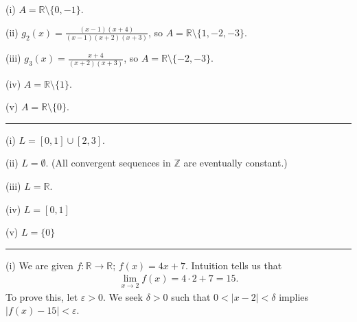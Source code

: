 \documentclass[letterpaper,10pt,english]{jupyterBook}
\begin{document}
\sphinxAtStartPar
(i) \(A=\mathbb{R} \setminus \{0, -1\}\).

\sphinxAtStartPar
(ii) \(g_{2}(x) = \displaystyle\frac{(x-1)(x+4)}{(x-1)(x+2)(x+3)}\), so \(A=\mathbb{R} \setminus \{1, -2, -3\}\).

\sphinxAtStartPar
(iii) \(g_{3}(x) = \displaystyle\frac{x+4}{(x+2)(x+3)}\), so \(A=\mathbb{R} \setminus \{-2, -3\}\).

\sphinxAtStartPar
(iv) \(A=\mathbb{R} \setminus \{1\}\).

\sphinxAtStartPar
(v) \(A=\mathbb{R} \setminus \{0\}\).


\bigskip\hrule\bigskip

\label{\detokenize{Solutions-full:id1}}
\sphinxAtStartPar
{\hyperref[\detokenize{Problems:id2}]{}} 

\sphinxAtStartPar
(i) \(L=[0,1]\cup[2,3]\).

\sphinxAtStartPar
(ii) \(L=\emptyset\).  (All convergent sequences in \(\mathbb{Z}\) are eventually constant.)

\sphinxAtStartPar
(iii) \(L=\mathbb{R}\).

\sphinxAtStartPar
(iv) \(L=[0,1]\)

\sphinxAtStartPar
(v) \(L=\{0\}\)


\bigskip\hrule\bigskip

\label{\detokenize{Solutions-full:id2}}
\sphinxAtStartPar
{\hyperref[\detokenize{Problems:id3}]{}} 

\sphinxAtStartPar
(i) We are given \(f:\mathbb{R}\to\mathbb{R}\); \(f(x)=4x+7\). Intuition tells us that
\begin{equation*}
\begin{split}
\lim_{x\rightarrow 2}f(x) = 4\cdot 2+7 = 15.
\end{split}
\end{equation*}
\sphinxAtStartPar
To prove this, let \(\varepsilon>0\). We seek \(\delta>0\) such that \(0<|x-2|<\delta\) implies \(|f(x)-15|<\varepsilon\).
\end{document}
